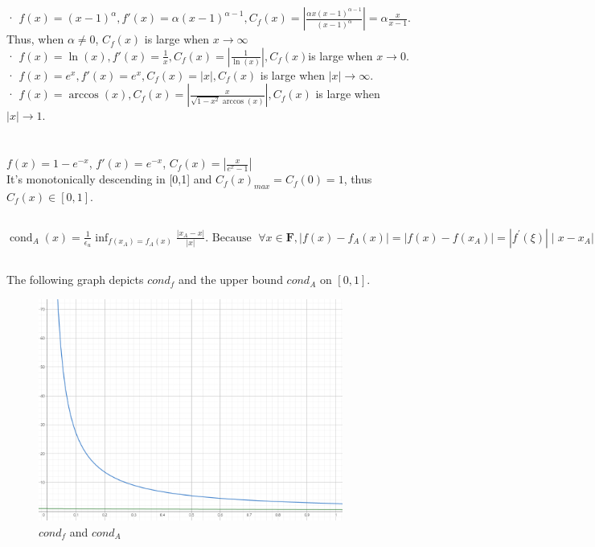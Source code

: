 \documentclass[UTF8]{ctexart}
\begin{document}
\section{}
\noindent  · $f(x) = (x-1)^\alpha , f'(x) = \alpha(x-1)^{\alpha - 1},C_f(x) = |\frac{\alpha x(x-1)^{\alpha - 1}}{(x-1)^{\alpha}}| = \alpha \frac{x}{x-1}$. Thus, when $\alpha \neq 0$, $C_f(x)$ is large when $x \rightarrow \infty$\\
· $f(x)=\ln (x), f'(x) = \frac{1}{x}, C_{f}(x)=\left|\frac{1}{\ln (x)}\right|, C_{f}(x)$is large when  $x \rightarrow 0 .$\\
· $ f(x)=e^{x}, f'(x) = e^{x}, C_{f}(x)=|x|, C_{f}(x)$ is large when  $|x| \rightarrow \infty .$\\
· $f(x)=\arccos (x), C_{f}(x)=\left|\frac{x}{\sqrt{1-x^{2}} \arccos (x)}\right|, C_{f}(x)$  is large when  $|x| \rightarrow 1 .$
\section{}
\subsection{}
$f(x) = 1 - e^{-x}$, $f'(x) = e^{-x}$, $C_f(x) = |\frac{x}{e^x-1}|$\\
It's monotonically descending in [0,1] and $C_f(x)_{max} = C_f(0) = 1$, thus $C_f(x) \in [0,1]$.
\subsection{}
$\operatorname{cond}_{A}(x)=\frac{1}{\epsilon_{u}} \inf _{f\left(x_{A}\right)=f_{A}(x)} \frac{\left|x_{A}-x\right|}{|x|} . \text { Because }\; \forall x \in \mathbf{F},\left|f(x)-f_{A}(x)\right|=\left|f(x)-f\left(x_{A}\right)\right|=\left|f^{\prime}(\xi)\right| \mid x-x_{A} \mid \leq e \epsilon_{u}, \xi \in\left[x, x_{A}\right] \text {, so }\; \operatorname{cond}_{A}(x) \leq \frac{e}{|x|} .$

\subsection{}
\noindent The following graph depicts $cond_f$ and the upper bound $cond_A$ on $[0,1]$.
\begin{figure}[htp]
    \centering
    \includegraphics[width=10cm]{plot.png}
    \caption{$cond_f$ and $cond_A$}
    \label{fig:1L}
\end{figure}
\end{document}
